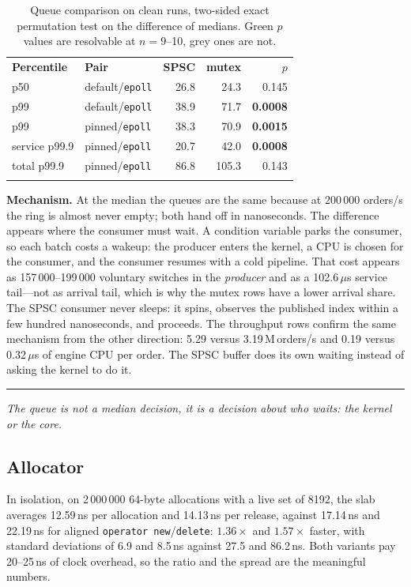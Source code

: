 \documentclass[conference]{IEEEtran}
\newcommand{\reading}[1]{%
  \par\vspace{1pt}\noindent
  \textcolor{corange}{\rule[-0.2ex]{2.2pt}{1.05em}}\hspace{3pt}%
  \textit{\textcolor{cgray}{#1}}\par\vspace{2pt}}
\newcommand{\us}{\,$\mu$s}
\newcommand{\ns}{\,ns}
\newcommand{\Mops}{\,M\,orders/s}
\begin{document}
\begin{table}[!t]
\centering
\caption{Queue comparison on clean runs, two-sided exact permutation test on the
difference of medians. Green $p$ values are resolvable at $n=9$--10, grey ones
are not.}
\label{tab:queuetests}
\small
\setlength{\tabcolsep}{4pt}
\begin{tabular}{@{}llrrr@{}}
\arrayrulecolor{cblue}\toprule
\rowcolor{cblueL}\textbf{Percentile} & \textbf{Pair} & \textbf{SPSC} & \textbf{mutex} & \textbf{$p$} \\
\arrayrulecolor{cblue!45}\midrule
p50           & default/\texttt{epoll} & 26.8 & 24.3 & \textcolor{cgray}{0.145} \\
p99           & default/\texttt{epoll} & 38.9 & 71.7 & \textcolor{cgreen}{\textbf{0.0008}} \\
p99           & pinned/\texttt{epoll}  & 38.3 & 70.9 & \textcolor{cgreen}{\textbf{0.0015}} \\
service p99.9 & pinned/\texttt{epoll}  & 20.7 & 42.0 & \textcolor{cgreen}{\textbf{0.0008}} \\
total p99.9   & pinned/\texttt{epoll}  & 86.8 & 105.3 & \textcolor{cgray}{0.143} \\
\arrayrulecolor{cblue}\bottomrule
\end{tabular}
\end{table}

\textbf{Mechanism.} At the median the queues are the same because at
200\,000 orders/s the ring is almost never empty; both hand off in nanoseconds.
The difference appears where the consumer must wait. A condition variable parks
the consumer, so each batch costs a wakeup: the producer enters the kernel, a CPU
is chosen for the consumer, and the consumer resumes with a cold pipeline. That
cost appears as 157\,000--199\,000 voluntary switches in the \emph{producer} and
as a 102.6\us{} service tail---not as arrival tail, which is why the mutex rows
have a lower arrival share. The SPSC consumer never sleeps: it spins, observes
the published index within a few hundred nanoseconds, and proceeds. The
throughput rows confirm the same mechanism from the other direction: 5.29 versus
3.19\Mops{} and 0.19 versus 0.32\us{} of engine CPU per order. The SPSC buffer
does its own waiting instead of asking the kernel to do it.

\reading{The queue is not a median decision, it is a decision about who waits:
the kernel or the core.}

\subsection{Allocator}
In isolation, on 2\,000\,000 64-byte allocations with a live set of 8192, the
slab averages 12.59\ns{} per allocation and 14.13\ns{} per release, against
17.14\ns{} and 22.19\ns{} for aligned \texttt{operator new}/\texttt{delete}:
$1.36\times$ and $1.57\times$ faster, with standard deviations of 6.9 and 8.5\ns{}
against 27.5 and 86.2\ns. Both variants pay 20--25\ns{} of clock overhead, so the
ratio and the spread are the meaningful numbers.
\end{document}
